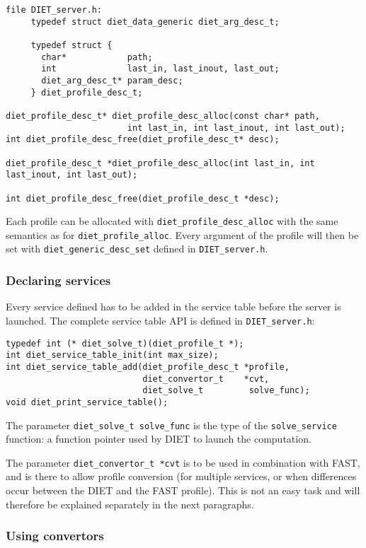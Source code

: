{{{\begin{verbatim}
file DIET_server.h:
     typedef struct diet_data_generic diet_arg_desc_t;

     typedef struct {
       char*            path;
       int              last_in, last_inout, last_out;
       diet_arg_desc_t* param_desc;
     } diet_profile_desc_t;

diet_profile_desc_t* diet_profile_desc_alloc(const char* path,
                        int last_in, int last_inout, int last_out);
int diet_profile_desc_free(diet_profile_desc_t* desc);

diet_profile_desc_t *diet_profile_desc_alloc(int last_in, int last_inout, int last_out);

int diet_profile_desc_free(diet_profile_desc_t *desc);
\end{verbatim}
}

Each profile can be allocated with \texttt{diet\_profile\_desc\_alloc} with the
same semantics as for \texttt{diet\_profile\_alloc}. Every argument of the
profile will then be set with \texttt{diet\_generic\_desc\_set} defined in
\texttt{DIET\_server.h}.

\subsubsection*{Declaring services}

Every service defined has to be added in the service table before the server is
launched. The complete service table API is defined in \texttt{DIET\_server.h}:
{\footnotesize
\begin{verbatim}
typedef int (* diet_solve_t)(diet_profile_t *);
int diet_service_table_init(int max_size);
int diet_service_table_add(diet_profile_desc_t *profile,
                           diet_convertor_t    *cvt,
                           diet_solve_t         solve_func);
void diet_print_service_table();
\end{verbatim}
}

The parameter \texttt{diet\_solve\_t solve\_func} is the type of the
\texttt{solve\_service} function: a function pointer used by DIET to launch the
computation.

The parameter \texttt{diet\_convertor\_t *cvt} is to be used in
combination with FAST, and is there to allow profile conversion (for
multiple services, or when differences occur between the DIET and the
FAST profile). This is not an easy task and will therefore be
explained separately in the next paragraphs.

\subsubsection*{Using convertors}

}}
